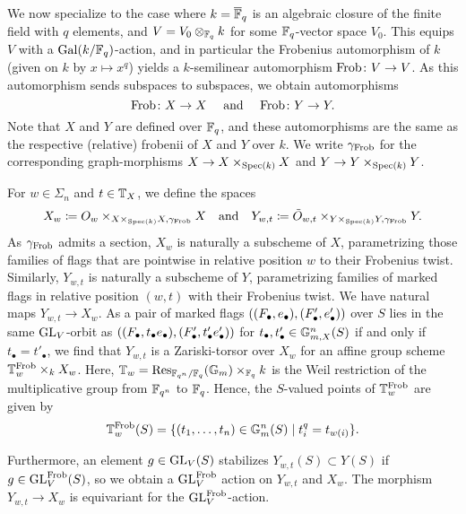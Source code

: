 \documentclass[../main.tex]{subfiles}
\begin{document}
We now specialize to the case where $k = \overline {\mathbb{F}}_q$ is an algebraic closure of 
the finite field with $q$ elements, and $V = V_0 \otimes_{\mathbb{F}_q} k$ for 
some $\mathbb{F}_q$-vector space $V_0$. 
This equips $V$ with a $\operatorname{Gal}(k/\mathbb{F}_q)$-action, and in particular the Frobenius
automorphism of $k$ (given on $k$ by $x\mapsto x^q$) yields a $k$-semilinear
automorphism $\mathrm{Frob}\colon  V \to V$. As this automorphism sends subspaces to
subspaces, we obtain automorphisms 
\begin{equation*}
  \mathrm{Frob}\colon  X \to X \quad \text{ and } \quad \mathrm{Frob}\colon  Y \to Y.
\end{equation*}
Note that $X$ and $Y$ are defined over $\mathbb{F}_q$, and these automorphisms are 
the same as the respective (relative) frobenii of $X$ and $Y$ over $k$. We write
$\gamma_{\mathrm{Frob}}$ for the corresponding graph-morphisms $X \to X \times_{\operatorname{Spec}(k)} X$ and 
$Y \to Y\times_{\operatorname{Spec}(k)} Y$.

For $w \in \Sigma_n$ and $t \in \mathbb{T}_X$, we define the spaces
\begin{equation}\label{eq:defXYsigma}
  X_w \coloneqq O_w \times_{X \times_{\operatorname{Spec}(k)}X, \gamma_{\mathrm{Frob}}} X
  \quad \text{and} \quad
  Y_{w,t} \coloneqq \tilde O_{w,t} \times_{Y \times_{\operatorname{Spec}(k)}Y,
  \gamma_{\mathrm{Frob}}} Y.
\end{equation}
As $\gamma_{\mathrm{Frob}}$ admits a section, $X_w$ is naturally a subscheme of $X$,
parametrizing those families of flags that are pointwise in relative position
$w$ to their Frobenius twist. Similarly, $Y_{w, t}$ is naturally a subscheme of $Y$,
parametrizing families of marked flags in relative position $(w,t)$ with their
Frobenius twist. 
We have natural maps $Y_{w, t} \to X_w$. 
As a pair of marked flags $((F_\bullet, e_\bullet), (F_\bullet', e_\bullet'))$ over $S$
lies in the same $\operatorname{GL}_V$-orbit as $((F_\bullet, t_\bullet e_\bullet), (F_\bullet', t'_\bullet
e_\bullet'))$ for $t_\bullet, t'_\bullet \in \mathbb{G}_{m,X}^n(S)$ if and only if 
$t_\bullet = t'_\bullet$, we find that $Y_{w,t}$ is a
Zariski-torsor over $X_w$ for an affine group scheme $\mathbb{T}_w^{\mathrm{Frob}} \times_k
X_w$. Here, $\mathbb{T}_w = \operatorname{Res}_{\mathbb{F}_{q^n}/\mathbb{F}_{q}}(\mathbb{G}_m) \times_{\mathbb{F}_q} k$ is the
Weil restriction of the multiplicative group from $\mathbb{F}_{q^n}$ to $\mathbb{F}_q$. 
Hence, the $S$-valued points of $\mathbb{T}_w^{\mathrm{Frob}}$ are given by
\begin{equation*}
  \mathbb{T}_{w}^{\mathrm{Frob}}(S) = \{(t_1, \dots, t_n) \in \mathbb{G}_{m}^n(S) \mid 
    t_i^q = t_{w(i)}\}.
\end{equation*}

Furthermore, an element $g \in \operatorname{GL}_V(S)$ stabilizes $Y_{w,t}(S) \subset Y(S)$ if
$g \in \operatorname{GL}_V^{\mathrm{Frob}}(S)$, so we obtain a $\operatorname{GL}_V^{\mathrm{Frob}}$ action on $Y_{w,t}$ and 
$X_w$. The morphism $Y_{w,t} \to X_w$ is equivariant for the $\operatorname{GL}_V^{\mathrm{Frob}}$-action.
\end{document}
